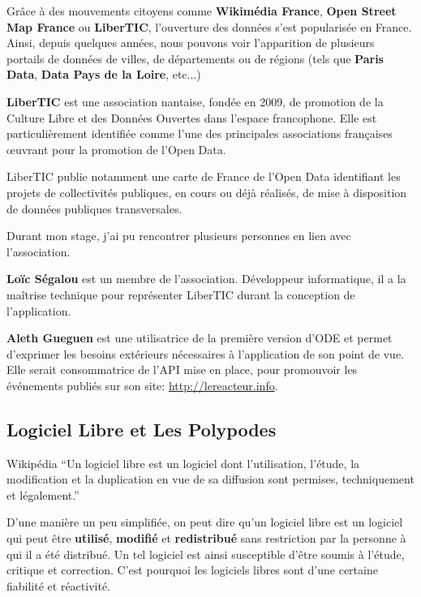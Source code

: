 Grâce à des mouvements citoyens comme \textbf{Wikimédia France}, \textbf{Open Street Map France} ou \textbf{LiberTIC}, l'ouverture des données s'est popularisée en France. Ainsi, depuis quelques années, nous pouvons voir l'apparition de plusieurs portails de données de villes, de départements ou de régions (tels que \textbf{Paris Data}, \textbf{Data Pays de la Loire}, etc...)

\textbf{LiberTIC} est une association nantaise, fondée en 2009, de promotion de la Culture Libre et des Données Ouvertes dans l'espace francophone. Elle est particulièrement identifiée comme l'une des principales associations françaises œuvrant pour la promotion de l'Open Data.

LiberTIC publie notamment une carte de France de l'Open Data identifiant les projets de collectivités publiques, en cours ou déjà réalisés, de mise à disposition de données publiques transversales.

\vspace{1cm}

Durant mon stage, j'ai pu rencontrer plusieurs personnes en lien avec l'association.

\textbf{Loïc Ségalou} est un membre de l'association. Développeur informatique, il a la maîtrise technique pour représenter LiberTIC durant la conception de l'application.

\textbf{Aleth Gueguen} est une utilisatrice de la première version d'ODE et permet d'exprimer les besoins extérieurs nécessaires à l'application de son point de vue. Elle serait consommatrice de l'API mise en place, pour promouvoir les événements publiés sur son site: \url{http://lereacteur.info}.

\subsection{Logiciel Libre et Les Polypodes}

\begin{aquote}{Wikipédia}
``Un logiciel libre est un logiciel dont l'utilisation, l'étude, la modification et la duplication en vue de sa diffusion sont permises, techniquement et légalement.''
\end{aquote}

D'une manière un peu simplifiée, on peut dire qu'un logiciel libre est un logiciel qui peut être \textbf{utilisé}, \textbf{modifié} et \textbf{redistribué} sans restriction par la personne à qui il a été distribué. Un tel logiciel est ainsi susceptible d'être soumis à l'étude, critique et correction. C'est pourquoi les logiciels libres sont d'une certaine fiabilité et réactivité.

